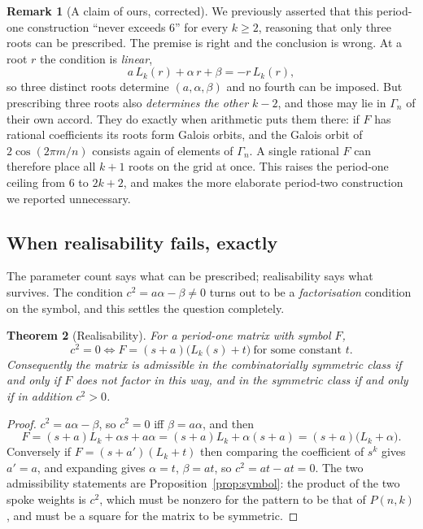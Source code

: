 \documentclass[11pt]{article}
\newtheorem{theorem}{Theorem}
\theoremstyle{definition}
\newtheorem{remark}[theorem]{Remark}
\begin{document}
\begin{remark}[A claim of ours, corrected]
We previously asserted that this period-one construction ``never exceeds $6$''
for every $k\ge2$, reasoning that only three roots can be prescribed. The
premise is right and the conclusion is wrong. At a root $r$ the condition is
\emph{linear},
\begin{equation}\label{eq:rootlin}
  a\,L_k(r)+\alpha\,r+\beta=-r\,L_k(r),
\end{equation}
so three distinct roots determine $(a,\alpha,\beta)$ and no fourth can be
imposed. But prescribing three roots also \emph{determines the other $k-2$},
and those may lie in $\Gamma_n$ of their own accord. They do exactly when
arithmetic puts them there: if $F$ has rational coefficients its roots form
Galois orbits, and the Galois orbit of $2\cos(2\pi m/n)$ consists again of
elements of $\Gamma_n$. A single rational $F$ can therefore place all $k+1$
roots on the grid at once. This raises the period-one ceiling from $6$ to
$2k+2$, and makes the more elaborate period-two construction we reported
unnecessary.
\end{remark}

\subsection*{When realisability fails, exactly}
The parameter count says what can be prescribed; realisability says what
survives. The condition $c^{2}=a\alpha-\beta\ne0$ turns out to be a
\emph{factorisation} condition on the symbol, and this settles the question
completely.

\begin{theorem}[Realisability]\label{thm:realis}
For a period-one matrix with symbol $F$,
\[
  c^{2}=0
  \iff
  F=(s+a)\bigl(L_k(s)+t\bigr)\ \text{for some constant }t .
\]
Consequently the matrix is admissible in the combinatorially symmetric class
if and only if $F$ does \emph{not} factor in this way, and in the symmetric
class if and only if in addition $c^{2}>0$.
\end{theorem}

\begin{proof}
$c^{2}=a\alpha-\beta$, so $c^{2}=0$ iff $\beta=a\alpha$, and then
\[
  F=(s+a)L_k+\alpha s+a\alpha=(s+a)L_k+\alpha(s+a)=(s+a)\bigl(L_k+\alpha\bigr).
\]
Conversely if $F=(s+a')(L_k+t)$ then comparing the coefficient of $s^{k}$ gives
$a'=a$, and expanding gives $\alpha=t$, $\beta=at$, so $c^{2}=at-at=0$. The
two admissibility statements are Proposition~\ref{prop:symbol}: the product of
the two spoke weights is $c^{2}$, which must be nonzero for the pattern to be
that of $P(n,k)$, and must be a square for the matrix to be symmetric.
\end{proof}
\end{document}
